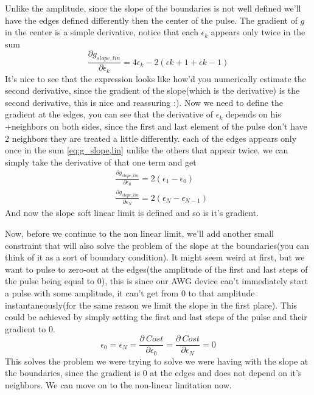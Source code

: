 \documentclass[english, a4paper, 12pt, twoside]{article}
\numberwithin{equation}{section} %
\begin{document}
Unlike the amplitude, since the slope of the boundaries is not well defined we'll have the edges defined differently then the center of the pulse. The gradient of \(g\) in the center is a simple derivative, notice that each \(\epsilon_k\) appears only twice in the sum
\[
    \frac{\partial g_{slope, lin}}{\partial \epsilon_k} = 4\epsilon_k - 2(\epsilon{k+1} + \epsilon{k-1})
\]
It's nice to see that the expression looks like how'd you numerically estimate the second derivative, since the gradient of the slope(which is the derivative) is the second derivative, this is nice and reassuring :). Now we need to define the gradient at the edges, you can see that the derivative of \(\epsilon_k\) depends on his 
+neighbors on both sides, since the first and last element of the pulse don't have 2 neighbors they are treated a little differently. each of the edges appears only once in the sum \ref{eq:g_slope,lin} unlike the others that appear twice, we can simply take the derivative of that one term and get
\begin{align*}
    &\frac{\partial g_{slope, lin}}{\partial \epsilon_0} = 2(\epsilon_1 - \epsilon_0) \\
    &\frac{\partial g_{slope, lin}}{\partial \epsilon_N} = 2(\epsilon_N - \epsilon_{N-1})
\end{align*} %
And now the slope soft linear limit is defined and so is it's gradient.

Now, before we continue to the non linear limit, we'll add another small constraint that will also solve the problem of the slope at the boundaries(you can think of it as a sort of boundary condition). It might seem weird at first, but we want to pulse to zero-out at the edges(the amplitude of the first and last steps of the pulse being equal to 0), this is since our AWG device can't immediately start a pulse with some amplitude, it can't get from 0 to that amplitude instantaneously(for the same reason we limit the slope in the first place). This could be achieved by simply setting the first and last steps of the pulse and their gradient to 0.
\[
    \epsilon_0 = \epsilon_N = \frac{\partial \ Cost}{\partial \epsilon_0} = \frac{\partial \ Cost}{\partial \epsilon_N} = 0
\]
This solves the problem we were trying to solve we were having with the slope at the boundaries, since the gradient is 0 at the edges and does not depend on it's neighbors. We can move on to the non-linear limitation now.

\end{document}
